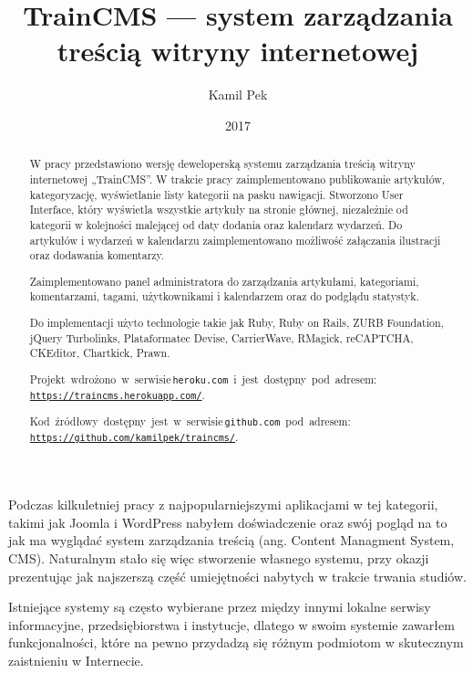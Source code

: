 \documentclass[openright]{xmgr}
\author   {Kamil Pek}
\title    {TrainCMS --- system zarządzania treścią witryny internetowej}
\date     {2017}
\begin{document}
\begin{abstract}
W pracy przedstawiono wersję deweloperską systemu zarządzania treścią witryny internetowej „TrainCMS”. W trakcie pracy zaimplementowano publikowanie artykułów, kategoryzację, wyświetlanie listy kategorii na pasku nawigacji. Stworzono User Interface, który wyświetla wszystkie artykuły na stronie głównej, niezależnie od kategorii w kolejności malejącej od daty dodania oraz kalendarz wydarzeń. Do artykułów i wydarzeń w kalendarzu zaimplementowano możliwość załączania ilustracji oraz dodawania komentarzy.

Zaimplementowano panel administratora do zarządzania artykułami, kategoriami, komentarzami, tagami, użytkownikami i kalendarzem oraz do podglądu statystyk.

Do implementacji użyto technologie takie jak Ruby, Ruby on Rails, ZURB Foundation, jQuery Turbolinks, Plataformatec Devise, CarrierWave, RMagick, reCAPTCHA, CKEditor, Chartkick, Prawn.

\mbox{Projekt wdrożono w serwisie\, \\\texttt{heroku.com} i jest dostępny pod adresem:} \\\texttt{\url{https://traincms.herokuapp.com/}}.

\mbox{Kod źródłowy dostępny jest w serwisie\, \\\texttt{github.com} pod adresem:} \\\texttt{\url{https://github.com/kamilpek/traincms/}}.
\end{abstract}


\maketitle

\introduction
Podczas kilkuletniej pracy z najpopularniejszymi aplikacjami w tej kategorii, takimi jak Joomla i WordPress nabyłem doświadczenie oraz swój pogląd na to jak ma wyglądać system zarządzania treścią (ang. Content Managment System, CMS). Naturalnym stało się więc stworzenie własnego systemu, przy okazji prezentując jak najszerszą część umiejętności nabytych w trakcie trwania studiów.

Istniejące systemy są często wybierane przez między innymi lokalne serwisy informacyjne, przedsiębiorstwa i instytucje, dlatego w swoim systemie zawarłem funkcjonalności, które na pewno przydadzą się różnym podmiotom w skutecznym zaistnieniu w Internecie.
\end{document}
